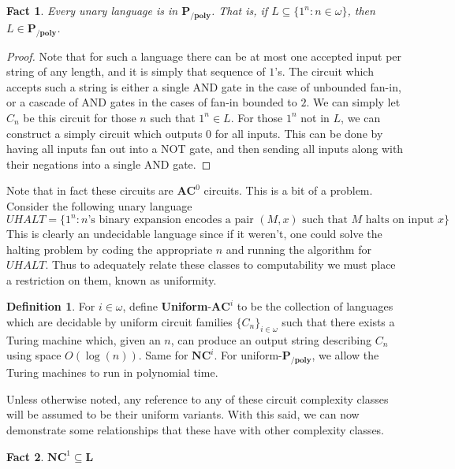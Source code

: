 \documentclass{article}
\theoremstyle{definition}
\newtheorem{definition}{Definition}[section]
\theoremstyle{plain}
\theoremstyle{theorem}
\newtheorem{fact}{Fact}[section]
\begin{document}
\begin{fact}
	Every unary language is in $\bm{P_{/poly}}$. That is, if $L \subseteq \{1^n: n \in \omega\}$, then $L \in \bm{P_{/poly}}$. 
\end{fact}
\begin{proof}
	Note that for such a language there can be at most one accepted input per string of any length, and it is simply that sequence of $1$'s. The circuit which accepts such a string is either a single AND gate in the case of unbounded fan-in, or a cascade of AND gates in the cases of fan-in bounded to $2$. We can simply let $C_n$ be this circuit for those $n$ such that $1^n \in L$. For those $1^n$ not in $L$, we can construct a simply circuit which outputs $0$ for all inputs. This can be done by having all inputs fan out into a NOT gate, and then sending all inputs along with their negations into a single AND gate. 
\end{proof}
Note that in fact these circuits are $\bm{AC}^0$ circuits. This is a bit of a problem. Consider the following unary language
\[ UHALT = \{1^n: n\textrm{'s binary expansion encodes a pair $(M,x)$ such that $M$ halts on input $x$}\}  \]
This is clearly an undecidable language since if it weren't, one could solve the halting problem by coding the appropriate $n$ and running the algorithm for $UHALT$. Thus to adequately relate these classes to computability we must place a restriction on them, known as uniformity. 
\begin{definition}
	For $i \in \omega$, define \textbf{Uniform}-$\bm{AC}^i$ to be the collection of languages which are decidable by uniform circuit families $\{C_n\}_{i \in \omega}$ such that there exists a Turing machine which, given an $n$, can produce an output string describing $C_n$ using space $O(\log(n))$. Same for $\bm{NC}^i$. For uniform-$\bm{P_{/poly}}$, we allow the Turing machines to run in polynomial time. 
\end{definition}
Unless otherwise noted, any reference to any of these circuit complexity classes will be assumed to be their uniform variants. With this said, we can now demonstrate some relationships that these have with other complexity classes. 
\begin{fact}
	$\bm{NC}^1 \subseteq \bm{L}$
\end{fact}
\end{document}
